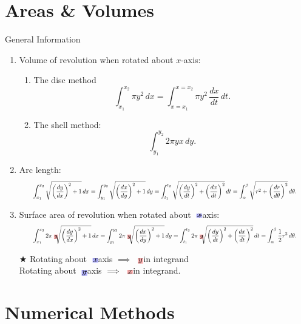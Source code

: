 \documentclass[oneside]{book}
\newcommand{\highlight}[2][red!50]{\mathpalette{\highlightwithstyle[#1]}{#2}}
\newcommand{\highlightwithstyle}[3][red!50]{
  \begingroup                         %
    \sbox0{$\mathsurround 0pt #2#3$}%
    \setlength{\fboxsep}{.5pt}        %
    \sbox2{\hspace{-.5pt}%
      \colorbox{#1}{\usebox0}%
    }%
    \dp2=\dp0 \ht2=\ht0 \wd2=\wd0     %
    \box2                             %
  \endgroup                           %
}
\begin{document}
\section{Areas \& Volumes}
\begin{stbox}{General Information}
  \begin{enumerate}
    \item Volume of revolution when rotated about \(x\)-axis: 
  \begin{enumerate}
    \item The disc method
    \[\int_{x_1}^{x_2}\pi y^2\,dx=\int_{x=x_1}^{x=x_2}\pi y^2\, \frac{dx}{dt}\,dt.\]
    \item The shell method:
    \[\int_{y_1}^{y_2}2\pi yx \,dy.\]
  \end{enumerate}
  \item Arc length:
  \begin{equation*}
    \resizebox{0.9\hsize}{!}{\(\displaystyle\int_{x_1}^{x_2}\sqrt{\left(\frac{dy}{dx}\right)^2+1}\,dx=\int_{y_1}^{y_2} \sqrt{\left(\frac{dx}{dy}\right)^2+1}\,dy=\int_{t_1}^{t_2}\sqrt{\left(\frac{dy}{dt}\right)^2+\left(\frac{dx}{dt}\right)^2}\,dt=\int_{\alpha}^{\beta}\sqrt{r^2+\left(\frac{dr}{d\theta}\right)^2}\,d\theta.\)}
    \end{equation*}
  \item Surface area of revolution when rotated about \(\highlight[blue!30]{x}\)-axis: 
  \begin{equation*}
    \resizebox{0.9\hsize}{!}{\(\displaystyle\int_{x_1}^{x_2}2\pi \highlight[red!30]{y} \sqrt{\left(\frac{dy}{dx}\right)^2+1}\,dx=\int_{y_1}^{y_2}2\pi \highlight[red!30]{y} \sqrt{\left(\frac{dx}{dy}\right)^2+1}\,dy=\int_{t_1}^{t_2}2\pi \highlight[red!30]{y} \sqrt{\left(\frac{dy}{dt}\right)^2+\left(\frac{dx}{dt}\right)^2}\,dt=\int_{\alpha}^{\beta}\frac{1}{2}r^2\,d\theta.\)}
    \end{equation*}
  \begin{flushleft}
    \(\bigstar\) Rotating about \(\highlight[blue!30]{x}\)-axis \(\implies\) \(\highlight[red!30]{y}\) in integrand\\
    \hphantom{\(\bigstar\)} Rotating about \(\highlight[blue!30]{y}\)-axis \(\implies\) \(\highlight[red!30]{x}\) in integrand.
  \end{flushleft}
  \end{enumerate}
\end{stbox}
\newpage
\section{Numerical Methods}
\end{document}
